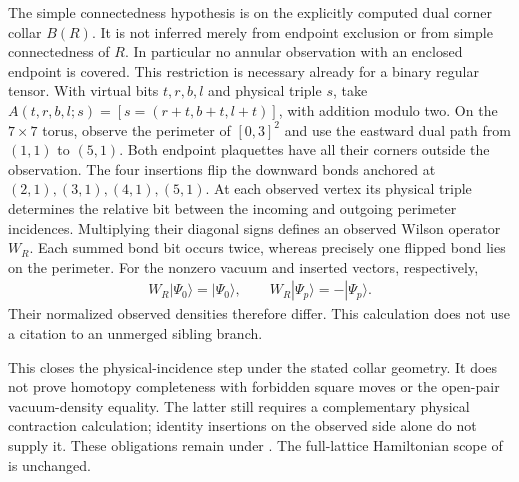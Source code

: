 \documentclass{article}
\begin{document}
The simple connectedness hypothesis is on the explicitly computed dual
corner collar $B(R)$. It is not inferred merely from endpoint exclusion
or from simple connectedness of $R$. In particular no annular observation
with an enclosed endpoint is covered. This restriction is necessary already
for a binary regular tensor. With virtual bits $t,r,b,l$ and physical triple $s$,
take $A(t,r,b,l;s)=[s=(r+t,b+t,l+t)]$, with addition modulo two.
On the $7\times7$ torus, observe the perimeter of $[0,3]^2$ and use the
eastward dual path from $(1,1)$ to $(5,1)$. Both endpoint plaquettes have
all their corners outside the observation. The four insertions flip the
downward bonds anchored at $(2,1),(3,1),(4,1),(5,1)$.
At each observed vertex its physical triple determines the relative bit
between the incoming and outgoing perimeter incidences. Multiplying their
diagonal signs defines an observed Wilson operator $W_R$. Each summed bond
bit occurs twice, whereas precisely one flipped bond lies on the perimeter.
For the nonzero vacuum and inserted vectors, respectively,
\begin{align}
    W_R|\Psi_0\rangle=|\Psi_0\rangle,\qquad
    W_R|\Psi_p\rangle=-|\Psi_p\rangle.
    \label{eq:scp10_physical_avoidance_annular_sign}
\end{align}
Their normalized observed densities therefore differ. This calculation
does not use a citation to an unmerged sibling branch.

This closes the physical-incidence step under the stated collar geometry.
It does not prove homotopy completeness with forbidden square moves or the
open-pair vacuum-density equality. The latter still requires a complementary
physical contraction calculation; identity insertions on the observed side
alone do not supply it. These obligations remain under .
The full-lattice Hamiltonian scope of  is unchanged.


\end{document}
